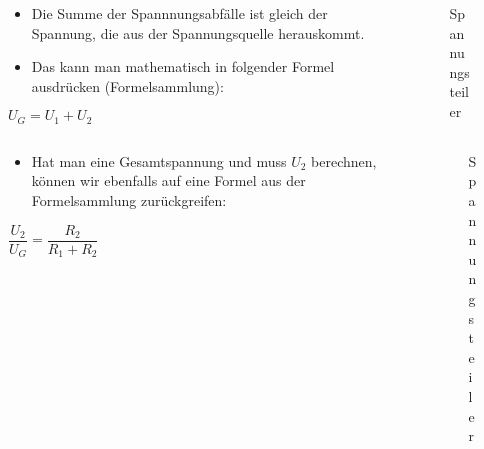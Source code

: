 \begin{frame}
\begin{columns}
    \begin{column}{0.48\textwidth}
    \begin{itemize}
  \item Die Summe der Spannnungsabfälle ist gleich der Spannung, die aus der Spannungsquelle herauskommt.
  \item Das kann man mathematisch in folgender Formel ausdrücken (Formelsammlung):
  \end{itemize}
$U_{ G } = U_{ 1 } + U_{ 2 }$


    \end{column}
   \begin{column}{0.48\textwidth}
       
\begin{figure}
    \caption{\scriptsize Spannungsteiler}
    \label{E 63. Spannungsteiler}
\end{figure}


   \end{column}
\end{columns}

\end{frame}

\begin{frame}
\begin{columns}
    \begin{column}{0.48\textwidth}
    \begin{itemize}
  \item Hat man eine Gesamtspannung und muss $U_{ 2 }$ berechnen, können wir ebenfalls auf eine Formel aus der Formelsammlung zurückgreifen:
  \end{itemize}
$\dfrac{ U_{ 2 } }{ U_{ G } } = \dfrac{ R_{ 2 } }{ R_{ 1 } + R_{ 2 } }$


    \end{column}
   \begin{column}{0.48\textwidth}
       
\begin{figure}
    \caption{\scriptsize Spannungsteiler}
    \label{E 63. Spannungsteiler}
\end{figure}


   \end{column}
\end{columns}

\end{frame}

